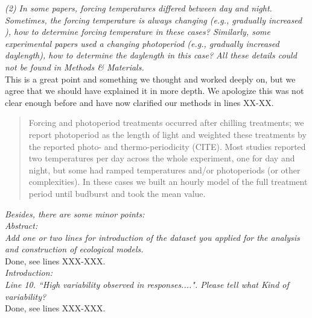 \documentclass[11pt]{article}
\begin{document}
\emph{(2) In some papers, forcing temperatures differed between day and night. Sometimes, the forcing temperature is always changing (e.g., gradually increased ), how to determine forcing temperature in these cases? Similarly, some experimental papers used a changing photoperiod (e.g., gradually increased daylength), how to determine the daylength in this case? All these details could not be found in Methods \& Materials.}\\

This is a great point and something we thought and worked deeply on, but we agree that we should have explained it in more depth. We apologize this was not clear enough before and have now clarified our methods in lines XX-XX.  \\
\begin{quote}
Forcing and photoperiod treatments occurred after chilling treatments; we report photoperiod as the length of light and weighted these treatments by the reported photo- and thermo-periodicity (CITE). Most studies reported two temperatures per day across the whole experiment, one for day and night, but some had ramped temperatures and/or photoperiods (or other complexities). In these cases we built an hourly model of the full treatment period until budburst and took the mean value. 
\end{quote}

\emph{Besides, there are some minor points:}\\


\emph{Abstract:}\\
\emph{Add one or two lines for introduction of the dataset you applied for the analysis and construction of ecological models.}\\
Done, see lines XXX-XXX.\\

\emph{Introduction:}\\
\emph{Line 10. ``High variability observed in responses....". Please tell what Kind of variability?}\\
Done, see lines XXX-XXX.\\
\end{document}
